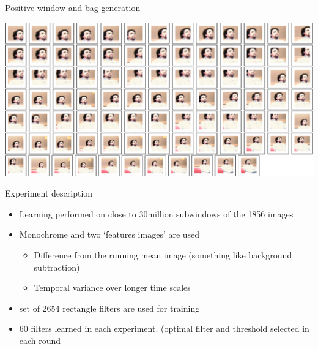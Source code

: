\documentclass{beamer}
\begin{document}
	\begin{frame}{Positive window and bag generation}
		\begin{center}
			\includegraphics[width=1\textwidth]{windows.png}
		\end{center}
	\end{frame}


	\begin{frame}{Experiment description}
			\begin{itemize}
				\item 	Learning performed on close to 30million subwindows of the 1856 images
				\item 	Monochrome and two `features images' are used
					\begin{itemize}
						\item Difference from the running mean image (something like background subtraction)
						\item Temporal variance over longer time scales
					\end{itemize}
				\item 	set of 2654 rectangle filters are used for training
				\item 	60 filters learned in each experiment. (optimal filter and threshold selected in each round

			\end{itemize}
	\end{frame}


\end{document}
